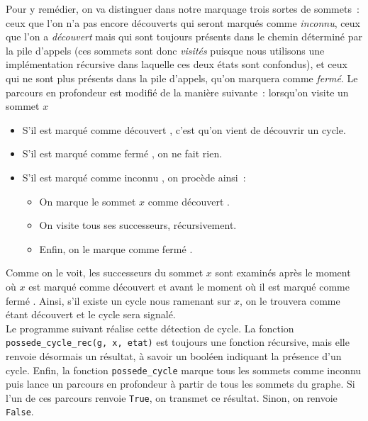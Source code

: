 \documentclass{magnolia}
\begin{document}
Pour y remédier, on va distinguer dans notre marquage trois sortes de sommets~:
ceux que l'on n'a pas encore découverts qui seront marqués comme \emph{inconnu}, ceux que
l'on a \emph{découvert} mais qui sont toujours présents dans le chemin déterminé
par la pile d'appels (ces sommets sont donc \emph{visités} puisque nous
utilisons une implémentation récursive dans laquelle ces deux états sont confondus),
et ceux qui ne sont plus présents dans la pile d'appels,
qu'on marquera comme \emph{fermé}.
Le parcours en profondeur est modifié de la manière suivante~: lorsqu'on visite un sommet
$x$
\begin{itemize}
\item S'il est marqué comme \og découvert \fg, c'est qu'on vient de découvrir un cycle.
\item S'il est marqué comme \og fermé \fg, on ne fait rien.
\item S'il est marqué comme \og inconnu \fg, on procède ainsi~:
  \begin{itemize}
  \item On marque le sommet $x$ comme \og découvert \fg.
  \item On visite tous ses successeurs, récursivement.
  \item Enfin, on le marque comme \og fermé \fg.
  \end{itemize}
\end{itemize}
Comme on le voit, les successeurs du sommet $x$ sont examinés après le moment où $x$
est marqué comme \og découvert \fg et avant le moment où il est marqué comme
\og fermé \fg. Ainsi, s'il existe un cycle nous ramenant sur $x$, on le trouvera
comme étant \og découvert \fg et le cycle sera signalé.\\

Le programme suivant réalise cette détection de cycle.
La fonction \verb!possede_cycle_rec(g, x, etat)! est toujours une fonction récursive, mais
elle renvoie désormais un résultat, à savoir un booléen indiquant la présence d'un cycle.
Enfin, la fonction \verb!possede_cycle! marque tous les sommets comme \og inconnu \fg puis
lance un parcours
en profondeur à partir de tous les sommets du graphe. Si l'un de ces parcours renvoie
\verb!True!, on transmet ce résultat. Sinon, on renvoie \verb!False!.
 
\end{document}
